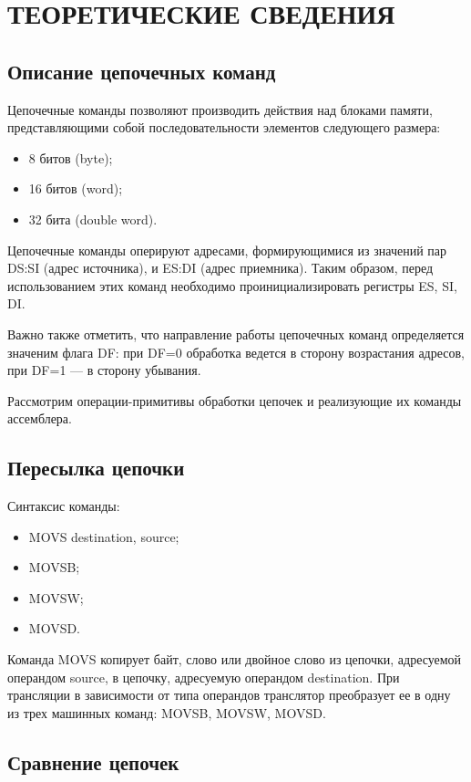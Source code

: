 \section{ТЕОРЕТИЧЕСКИЕ СВЕДЕНИЯ}

\subsection{Описание цепочечных команд}

Цепочечные команды позволяют производить действия над блоками памяти,
представляющими собой последовательности элементов следующего размера:

\begin{itemize}
\item 8 битов (byte);
\item 16 битов (word);
\item 32 бита (double word).
\end{itemize}

Цепочечные команды оперируют адресами,
формирующимися из значений пар DS:SI (адрес источника), и
ES:DI (адрес приемника). 
Таким образом, перед использованием этих команд необходимо проинициализировать
регистры ES, SI, DI.

Важно также отметить, что направление работы цепочечных команд определяется 
значеним флага DF: при DF=0 обработка ведется в сторону возрастания адресов,
при DF=1 --- в сторону убывания.

Рассмотрим операции-примитивы обработки цепочек и реализующие их команды
ассемблера.

\subsection{Пересылка цепочки}

Синтаксис команды:
\begin{itemize}
\item MOVS destination, source;
\item MOVSB;
\item MOVSW;
\item MOVSD.
\end{itemize}

Команда MOVS копирует байт, слово или двойное слово из цепочки, адресуемой операндом
source, в цепочку, адресуемую операндом destination. При трансляции в зависимости от
типа операндов транслятор преобразует ее в одну из трех машинных команд:
MOVSB, MOVSW, MOVSD.

\subsection{Сравнение цепочек}

